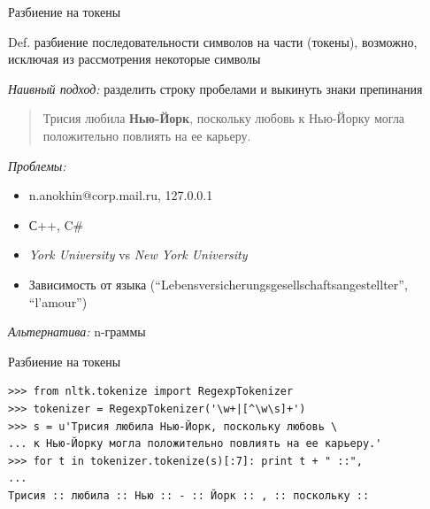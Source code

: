 \documentclass[10pt,a4paper]{beamer}
\begin{document}
\begin{frame}{Разбиение на токены}

\begin{block}{Def.}
разбиение последовательности символов на части (токены), возможно, исключая из рассмотрения некоторые символы
\end{block}

\vspace{1em}
{\it Наивный подход:} разделить строку пробелами и выкинуть знаки препинания
\begin{quote}
Трисия любила {\bf Нью-Йорк}, поскольку любовь к Нью-Йорку могла положительно повлиять на ее карьеру.
\end{quote}

{\it Проблемы:}
\begin{itemize}
\item n.anokhin@corp.mail.ru, 127.0.0.1
\item С++, C\#
\item {\it York University} vs {\it New York University}
\item Зависимость от языка (``Lebensversicherungsgesellschaftsangestellter'', ``l'amour'')
\end{itemize}

{\it Альтернатива:} n-граммы

\end{frame}


\begin{frame}[fragile]{Разбиение на токены}

\begin{shaded}
{\color{green}
\begin{verbatim}
>>> from nltk.tokenize import RegexpTokenizer
>>> tokenizer = RegexpTokenizer('\w+|[^\w\s]+')
>>> s = u'Трисия любила Нью-Йорк, поскольку любовь \
... к Нью-Йорку могла положительно повлиять на ее карьеру.'
>>> for t in tokenizer.tokenize(s)[:7]: print t + " ::",
... 
Трисия :: любила :: Нью :: - :: Йорк :: , :: поскольку ::
\end{verbatim}
}
\end{shaded}

\end{frame}

\end{document}
